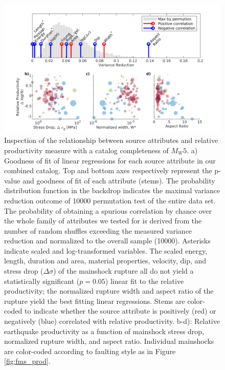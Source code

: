 \documentclass[draft]{agujournal}
\begin{document}
\begin{figure}[H]
\centering
\includegraphics{figures/stem_plot_mw5.png}
\caption{Inspection of the relationship between source attributes and relative productivity measure with a catalog  completeness of $M_W5$. a) Goodness of fit of linear regressions for each source attribute in our combined catalog. Top and bottom axes respectively represent the p-value and goodness of fit of each attribute (stems). The probability distribution function in the backdrop indicates the maximal variance reduction outcome of 10000 permutation test of the entire data set. The probability of obtaining a spurious correlation by chance over the whole family of attributes we tested for is derived from the number of random shuffles exceeding the measured variance reduction and normalized to the overall sample (10000). Asterisks indicate scaled and log-transformed variables. The scaled energy, length, duration and area, material properties, velocity, dip, and stress drop ($\Delta\sigma$) of the mainshock rupture all do not yield a statistically significant ($p=0.05$) linear fit to the relative productivity; the normalized rupture width and aspect ratio of the rupture yield the best fitting linear regressions. Stems are color-coded to indicate whether the source attribute is positively (red) or negatively (blue) correlated with relative productivity. b-d): Relative earthquake productivity as a function of mainshock stress drop, normalized rupture width, and aspect ratio. Individual mainshocks are color-coded according to faulting style as in Figure \ref{fig:fms_prod}.}
\label{fig:r2_finite_fault}
\end{figure}
\end{document}
